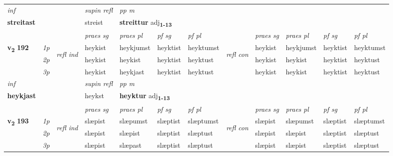 \begin{longtable}[l]{X>{\footnotesize\itshape}llXXXXlXXXX}
   {\textit{inf}} & &       & \textit{supin refl} & \textit{pp m} \\*
  {\textbf{streitast}} & &       & streist & \multicolumn{2}{l}{\textbf{streittur} adj\textbf{\textsubscript{1-13}}} \\*

\midrule

 & &   & \textit{praes sg}  & \textit{praes pl}    & \textit{ pf sg} & \textit{pf pl} & & \textit{praes sg}  & \textit{praes pl}    & \textit{pf sg} & \textit{pf pl }  \\ \cmidrule{4-7} \cmidrule{9-12}
 \multirow{2}{*}{{{\textbf{v{\textsubscript{2}}} \Large{\textbf{192}}}}}  & 1p & \multirow{3}{*}{\begin{turn}{90}\textit{refl ind}\end{turn}}  & heykist & heykjumst & heyktist & heyktumst & \multirow{3}{*}{\begin{turn}{90}\textit{refl con}\end{turn}}  &heykist & heykjumst & heyktist & heyktumst \\*
 & 2p &  & heykist & heykist & heyktist & heyktust & &heykist & heykist & heyktist & heyktust \\*
 & 3p  & & heykist & heykjast & heyktist & heyktust & & heykist & heykist& heyktist & heyktust \\*
\cmidrule{4-7} \cmidrule{9-12}

   {\textit{inf}} & &       & \textit{supin refl} & \textit{pp m} \\*
  {\textbf{heykjast}} & &       & heykst & \multicolumn{2}{l}{\textbf{heyktur} adj\textbf{\textsubscript{1-13}}} \\*

\midrule

 & &   & \textit{praes sg}  & \textit{praes pl}    & \textit{ pf sg} & \textit{pf pl} & & \textit{praes sg}  & \textit{praes pl}    & \textit{pf sg} & \textit{pf pl }  \\ \cmidrule{4-7} \cmidrule{9-12}
 \multirow{2}{*}{{{\textbf{v{\textsubscript{2}}} \Large{\textbf{193}}}}}  & 1p & \multirow{3}{*}{\begin{turn}{90}\textit{refl ind}\end{turn}}  & slæpist & slæpumst & slæptist & slæptumst & \multirow{3}{*}{\begin{turn}{90}\textit{refl con}\end{turn}}  &slæpist & slæpumst & slæptist & slæptumst \\*
 & 2p &  & slæpist & slæpist & slæptist & slæptust & &slæpist & slæpist & slæptist & slæptust \\*
 & 3p  & & slæpist & slæpast & slæptist & slæptust & & slæpist & slæpist& slæptist & slæptust \\*
\cmidrule{4-7} \cmidrule{9-12}


\end{longtable}
